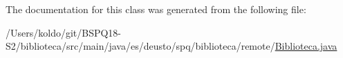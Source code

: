 The documentation for this class was generated from the following file\+:\begin{DoxyCompactItemize}
\item 
/\+Users/koldo/git/\+B\+S\+P\+Q18-\/\+S2/biblioteca/src/main/java/es/deusto/spq/biblioteca/remote/\mbox{\hyperlink{_biblioteca_8java}{Biblioteca.\+java}}\end{DoxyCompactItemize}
